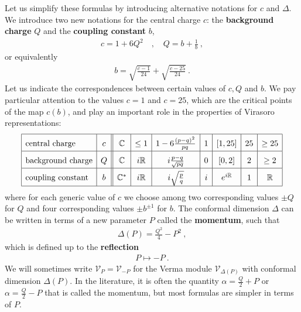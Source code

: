 \documentclass[12pt, a4paper, notitlepage, twoside]{report}
\numberwithin{equation}{section}
\theoremstyle{break}
\begin{document}
Let us simplify these formulas by introducing alternative notations for $c$ and $\Delta$.
We introduce two new notations for the central charge $c$: the \textbf{\boldmath background charge} $Q$ and the \textbf{\boldmath coupling constant} $b$,
\begin{align}
\boxed{ c= 1+6Q^2 }\quad , \quad \boxed{Q = b+\frac{1}{b}}\ ,
\label{cqb}
\end{align}
or equivalently
\begin{align}
 b = \sqrt{\frac{c-1}{24}} + \sqrt{\frac{c-25}{24}}\ .
\end{align}
Let us indicate the correspondences between certain values of $c,Q$ and $b$. We pay particular attention to the values $c=1$ and $c=25$, which are the critical points of the map $c(b)$, and play an important role in the properties of Virasoro representations:
\begin{align}
\renewcommand{\arraystretch}{1.7}
 \begin{array}{|l|c||c|c|c|c|c|c|c|}
  \hline
  \text{central\ charge} & c & \mathbb{C} & \leq 1 & 1-6\frac{(p-q)^2}{pq} & 1 & [1,25] & 25 & \geq 25 
\\
\hline
\text{background\ charge} & Q & \mathbb{C} & i{\mathbb{R}} & i\frac{p-q}{\sqrt{pq}} & 0 & [0,2] & 2 & \geq 2 
\\
\hline
\text{coupling\ constant} &
b& \mathbb{C}^* & i{\mathbb{R}} & i\sqrt{\frac{p}{q}} & i & e^{i\mathbb{R}} & 1 & {\mathbb{R}}
\\
\hline
 \end{array}
\label{cqbval}
\end{align}
where for each generic value of $c$ we choose among two corresponding values $\pm Q$ for $Q$ and four corresponding values $\pm b^{\pm 1}$ for $b$.
The conformal dimension $\Delta$ can be written in terms of a 
new parameter $P$ called the \textbf{\boldmath momentum}, such that 
\begin{align}
 \boxed{\Delta(P) = \frac{Q^2}{4} - P^2}\ ,
\label{daq}
\end{align}
which is defined up to the \textbf{\boldmath reflection}
\begin{align}
 P \mapsto -P\ .
\label{arqa}
\end{align}
We will sometimes write $\mathcal{V}_P=\mathcal{V}_{-P}$ for the Verma module $\mathcal{V}_{\Delta(P)}$ with conformal dimension $\Delta(P)$. In the literature, it is often the quantity $\alpha = \frac{Q}{2}+P$ or $\alpha=\frac{Q}{2}-P$ that is called the momentum, but most formulas are simpler in terms of $P$.
\end{document}
